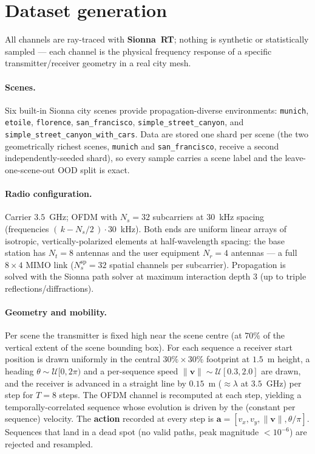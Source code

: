 \documentclass[11pt]{article}
\newcommand{\av}{\mathbf{a}}
\begin{document}
\section{Dataset generation}\label{sec:data}

All channels are ray-traced with \textbf{Sionna~RT}; nothing is synthetic or statistically sampled ---
each channel is the physical frequency response of a specific transmitter/receiver geometry in a real
city mesh.

\paragraph{Scenes.} Six built-in Sionna city scenes provide propagation-diverse environments:
\texttt{munich}, \texttt{etoile}, \texttt{florence}, \texttt{san\_francisco},
\texttt{simple\_street\_canyon}, and \texttt{simple\_street\_canyon\_with\_cars}. Data are stored one
shard per scene (the two geometrically richest scenes, \texttt{munich} and \texttt{san\_francisco},
receive a second independently-seeded shard), so every sample carries a scene label and the
leave-one-scene-out OOD split is exact.

\paragraph{Radio configuration.} Carrier $3.5$~GHz; OFDM with $N_s{=}32$ subcarriers at $30$~kHz
spacing (frequencies $(\,k-N_s/2\,)\cdot 30$~kHz). Both ends are uniform linear arrays of isotropic,
vertically-polarized elements at half-wavelength spacing: the base station has $N_t{=}8$ antennas and
the user equipment $N_r{=}4$ antennas --- a full $8\times4$ MIMO link ($N_s^{\text{sp}}{=}32$ spatial
channels per subcarrier). Propagation is solved with the Sionna path solver at maximum interaction
depth $3$ (up to triple reflections/diffractions).

\paragraph{Geometry and mobility.} Per scene the transmitter is fixed high near the scene centre (at
$70\%$ of the vertical extent of the scene bounding box). For each sequence a receiver start position
is drawn uniformly in the central $30\%\times30\%$ footprint at $1.5$~m height, a heading
$\theta\!\sim\!\mathcal U[0,2\pi)$ and a per-sequence speed $\|\mathbf v\|\!\sim\!\mathcal U[0.3,2.0]$
are drawn, and the receiver is advanced in a straight line by $0.15$~m (${\approx}\lambda$ at
$3.5$~GHz) per step for $T{=}8$ steps. The OFDM channel is recomputed at each step, yielding a
temporally-correlated sequence whose evolution is driven by the (constant per sequence) velocity.
The \textbf{action} recorded at every step is $\av=[v_x,v_y,\|\mathbf v\|,\theta/\pi]$. Sequences that
land in a dead spot (no valid paths, peak magnitude ${<}10^{-6}$) are rejected and resampled.
\end{document}
